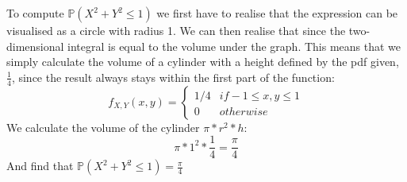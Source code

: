 To compute $\mathbb{P}(X^2+Y^2 \leq 1)$ we first have to realise that the expression can be visualised as a circle with radius 1. We can then realise that since the two-dimensional integral is equal to the volume under the graph. This means that we simply calculate the volume of a cylinder with a height defined by the pdf given, $\frac{1}{4}$, since the result always stays within the first part of the function:
$$
f_{X,Y}(x,y) =
\left\{
\begin{array}{ll}
1/4 &if -1 \leq x,y \leq 1 \\
0 &otherwise
\end{array}
\right.
$$
We calculate the volume of the cylinder $\pi * r^2 * h$:
$$
\pi * 1^2 * \frac{1}{4} = \frac{\pi}{4}
$$
And find that $\mathbb{P}(X^2+Y^2 \leq 1) = \frac{\pi}{4}$